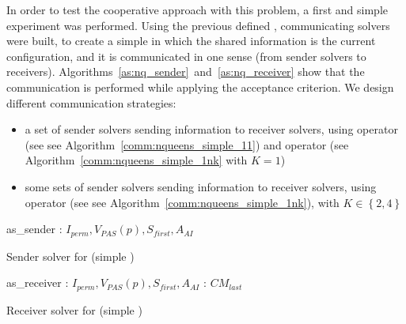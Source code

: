 In order to test the cooperative approach with this problem, a first and simple experiment was performed. Using the previous defined \as{}, communicating solvers were built, to create a simple \commstr{} in which the shared information is the current configuration, and it is communicated in one sense (from sender solvers to receivers). Algorithms~\ref{as:nq_sender}~and~\ref{as:nq_receiver} show that the communication is performed while applying the acceptance criterion. We design different communication strategies: 
\begin{itemize}
\item a set of sender solvers sending information to receiver solvers, using operator \oneTone{} (see see Algorithm~\ref{comm:nqueens_simple_11}) and operator \oneTn{} (see Algorithm~\ref{comm:nqueens_simple_1nk} with $K=1$)
\item some sets of sender solvers sending information to receiver solvers, using operator \oneTn{} (see see Algorithm~\ref{comm:nqueens_simple_1nk}), with $K\in\left\{2, 4\right\}$
\end{itemize}

\begin{algorithm}[H]
\dontprintsemicolon
\SetNoline
{}
   as\_sender\;
\algoindent {} : $I_{perm}, V_{PAS}(p), S_{first}, A_{AI}$ \;
\caption{Sender solver for \NQP{} (simple \commstr)}\label{as:nq_sender}
\end{algorithm}

\begin{algorithm}[H]
\dontprintsemicolon
\SetNoline
{}
   as\_receiver\;
\algoindent {} : $I_{perm}, V_{PAS}(p), S_{first}, A_{AI}$ \;
\algoindent {}: $CM_{last}$\;
\caption{Receiver solver for \NQP{} (simple \commstr)}\label{as:nq_receiver}
\end{algorithm}

